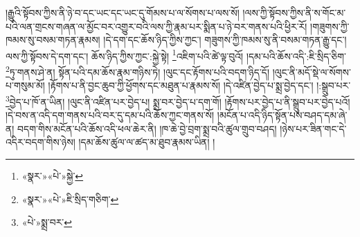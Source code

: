 །རྒྱུའི་སྟོབས་ཀྱིས་ནི་ཉེ་བ་དང་ཡང་དང་ཡང་དུ་གོམས་པ་ལ་སོགས་པ་ལས་སོ། །ལས་ཀྱི་སྟོབས་ཀྱིས་ནི་ས་གོང་མ་པའི་ལན་གྲངས་གཞན་ལ་མྱོང་བར་འགྱུར་བའི་ལས་ཀྱི་རྣམ་པར་སྨིན་པ་ཉེ་བར་གནས་པའི་ཕྱིར་རོ། །གཟུགས་ཀྱི་ཁམས་སུ་བསམ་གཏན་རྣམས། །དེ་དག་དང་ཆོས་ཉིད་ཀྱིས་ཀྱང་། གཟུགས་ཀྱི་ཁམས་སུ་ནི་བསམ་གཏན་རྒྱུ་དང་། ལས་ཀྱི་སྟོབས་དེ་དག་དང་། ཆོས་ཉིད་ཀྱིས་ཀྱང་:སྐྱེ་སྟེ། \footnote{«སྣར་»«པེ་»སྐྱེ་}འཇིག་པའི་ཚེ་ལྟ་བུའོ། །དམ་པའི་ཆོས་འདི་:ཇི་སྲིད་ཅིག་\footnote{«སྣར་»«པེ་»ཇི་སྲིད་གཅིག་}ཏུ་གནས་ཤེ་ན། སྟོན་པའི་དམ་ཆོས་རྣམ་གཉིས་ཏེ། །ལུང་དང་རྟོགས་པའི་བདག་ཉིད་དོ། །ལུང་ནི་མདོ་སྡེ་ལ་སོགས་པ་གསུམ་མོ། །རྟོགས་པ་ནི་བྱང་ཆུབ་ཀྱི་ཕྱོགས་དང་མཐུན་པ་རྣམས་སོ། །དེ་འཛིན་བྱེད་པ་སྨྲ་བྱེད་དང་། །:སྒྲུབ་པར་\footnote{«པེ་»སྨྲ་བར་}བྱེད་པ་ཁོ་ན་ཡིན། །ལུང་ནི་འཛིན་པར་བྱེད་པ། སྨྲ་བར་བྱེད་པ་དག་གོ། །རྟོགས་པར་བྱེད་པ་ནི་སྒྲུབ་པར་བྱེད་པའོ། །དེ་བས་ན་འདི་དག་གནས་པའི་བར་དུ་དམ་པའི་ཆོས་ཀྱང་གནས་སོ། །མངོན་པ་འདི་ཉིད་སྟོན་པས་བཤད་དམ་ཞེ་ན། བདག་གིས་མངོན་པའི་ཆོས་འདི་ཕལ་ཆེར་ནི། །ཁ་ཆེ་བྱེ་བྲག་སྨྲ་བའི་ཚུལ་གྲུབ་བཤད། །ཉེས་པར་ཟིན་གང་དེ་འདིར་བདག་གིས་ཉེས། །དམ་ཆོས་ཚུལ་ལ་ཚད་མ་ཐུབ་རྣམས་ཡིན། །
